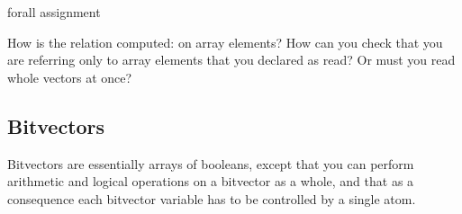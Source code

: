 forall assignment

How is the \AWAITS relation computed: on array elements? How can you
check that you are referring only to array elements that you declared
as read? Or must you read whole vectors at once? 


\subsection{Bitvectors}

Bitvectors are essentially arrays of booleans, except that you can
perform arithmetic and logical operations on a bitvector as a whole,
and that as a consequence each bitvector variable has to be controlled
by a single atom. 
